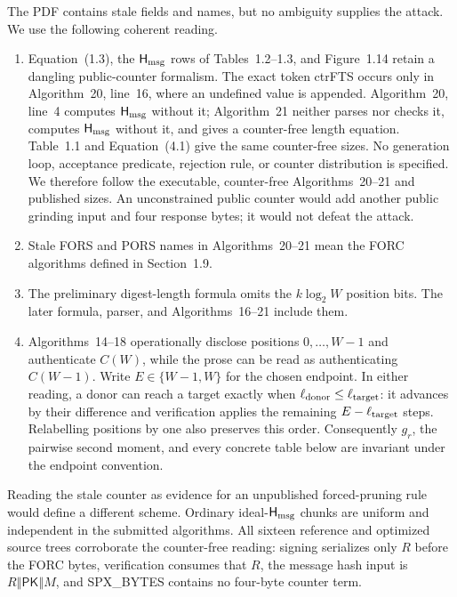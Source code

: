 \documentclass[11pt,a4paper]{article}
\newcommand{\concat}{\mathbin\Vert}
\newcommand{\Hmsg}{\ensuremath{\mathsf{H}_{\rm msg}}}
\newcommand{\pk}{\ensuremath{\mathsf{PK}}}
\begin{document}
The PDF contains stale fields and names, but no ambiguity supplies the attack.
We use the following coherent reading.
\begin{enumerate}[leftmargin=*,itemsep=2pt]
  \item Equation~(1.3), the $\Hmsg$ rows of Tables~1.2--1.3, and
        Figure~1.14 retain a dangling public-counter formalism.  The exact token
        \textsf{ctrFTS} occurs only in Algorithm~20, line~16, where an undefined
        value is appended.  Algorithm~20, line~4 computes $\Hmsg$ without it;
        Algorithm~21 neither parses nor checks it, computes $\Hmsg$ without it,
        and gives a counter-free length equation.  Table~1.1 and
        Equation~(4.1) give the same counter-free sizes.  No generation loop,
        acceptance predicate, rejection rule, or counter distribution is
        specified.  We therefore follow the executable, counter-free
        Algorithms~20--21 and published sizes.  An unconstrained public counter
        would add another public grinding input and four response bytes; it
        would not defeat the attack.
  \item Stale \textsf{FORS} and \textsf{PORS} names in Algorithms~20--21 mean
        the FORC algorithms defined in Section~1.9.
  \item The preliminary digest-length formula omits the $k\log_2 W$ position
        bits.  The later formula, parser, and Algorithms~16--21 include them.
  \item Algorithms~14--18 operationally disclose positions
        $0,\ldots,W-1$ and authenticate $C(W)$, while the prose can be read as
        authenticating $C(W-1)$.  Write $E\in\{W-1,W\}$ for the chosen endpoint.
        In either reading, a donor can reach a target exactly when
        $\ell_{\rm donor}\leq\ell_{\rm target}$: it advances by their difference
        and verification applies the remaining $E-\ell_{\rm target}$ steps.
        Relabelling positions by one also preserves this order.  Consequently
        $g_r$, the pairwise second moment, and every concrete table below are
        invariant under the endpoint convention.
\end{enumerate}
Reading the stale counter as evidence for an unpublished forced-pruning rule
would define a different scheme.  Ordinary ideal-$\Hmsg$ chunks are uniform
and independent in the submitted algorithms.  All sixteen reference and
optimized source trees corroborate the counter-free reading: signing serializes
only $R$ before the FORC bytes, verification consumes that $R$, the message hash
input is $R\concat\pk\concat M$, and \textsf{SPX\_BYTES} contains no four-byte
counter term.
\end{document}
